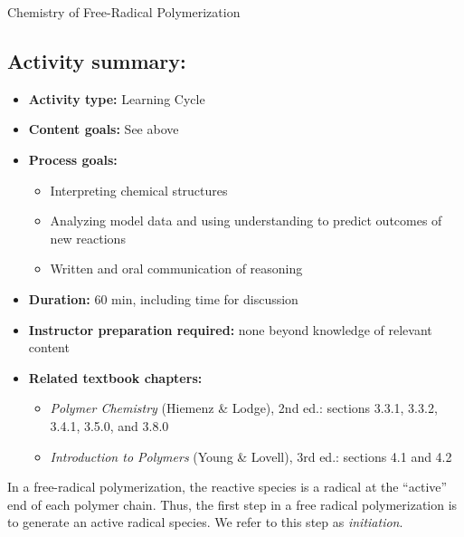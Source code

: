 \begin{activity}{Chemistry of Free-Radical Polymerization}
\begin{instructornotes}
	\subsection*{Activity summary:}
	\begin{itemize}
		\item \textbf{Activity type:} Learning Cycle
		\item \textbf{Content goals:} See above
		\item \textbf{Process goals:} %
			\begin{itemize}
				\item Interpreting chemical structures
				\item Analyzing model data and using understanding to predict outcomes of new reactions
				\item Written and oral communication of reasoning
			\end{itemize}
		\item \textbf{Duration:} 60 min, including time for discussion
		\item \textbf{Instructor preparation required:} none beyond knowledge of relevant content
		\item \textbf{Related textbook chapters:}
			\begin{itemize}
				\item \emph{Polymer Chemistry} (Hiemenz \& Lodge), 2nd ed.: sections 3.3.1, 3.3.2, 3.4.1, 3.5.0, and 3.8.0
				\item \emph{Introduction to Polymers} (Young \& Lovell), 3rd ed.: sections 4.1 and 4.2
			\end{itemize}
	\end{itemize}
	
\end{instructornotes}


\begin{model}[Initiation]
	\label{\labelbase:mdl:FRPinitchem}

	In a free-radical polymerization, the reactive species is a radical at the ``active'' end of each polymer chain.  Thus, the first step in a free radical polymerization is to generate an active radical species.  We refer to this step as \emph{initiation}.
	

\end{model}
\end{activity}
